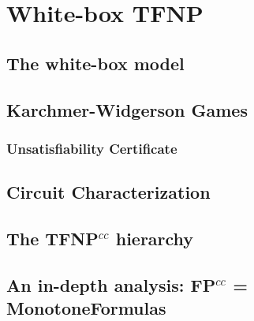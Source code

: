 \hypersetup{colorlinks=true, linkcolor=blue, citecolor=red}

\chapter{White-box TFNP} \label{chap:wb-tfnp}

\section{The white-box model}

\section{Karchmer-Widgerson Games}

\subsection{Unsatisfiability Certificate}

\section{Circuit Characterization}

\section{The TFNP$^{cc}$ hierarchy}

\section{An in-depth analysis: FP$^{cc}$ = MonotoneFormulas}

\cleardoublepage